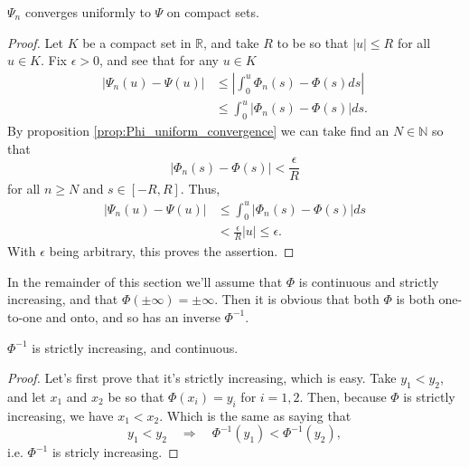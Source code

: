 \documentclass[11pt, a4paper]{article}
\begin{document}
\begin{appendix}
\begin{proposition}
\label{prop:Psi_uniform_convergence}
$\Psi_n$ converges uniformly to $\Psi$ on compact sets.
\end{proposition}
\begin{proof}
Let $K$ be a compact set in $\mathbb{R}$, and take $R$ to be so that $|u| \leq R$ for all $u \in K$. Fix $\epsilon > 0$, and see that for any $u\in K$
\begin{align*}
|\Psi_n(u) - \Psi(u)| &\leq \left|\int_0^u \Phi_n(s) - \Phi(s)ds \right| \\
&\leq \int_0^u |\Phi_n(s) - \Phi(s)|ds.
\end{align*}
By proposition \ref{prop:Phi_uniform_convergence} we can take find an $N \in \mathbb{N}$ so that
\begin{equation*}
|\Phi_n(s) - \Phi(s)| < \frac{\epsilon}{R}
\end{equation*}
for all $n \geq N$ and $s \in [-R, R]$. Thus,
\begin{align*}
|\Psi_n(u) - \Psi(u)| &\leq \int_0^u |\Phi_n(s) - \Phi(s)|ds \\
&< \frac{\epsilon}{R}|u| \leq \epsilon.
\end{align*}
With $\epsilon$ being arbitrary, this proves the assertion.
\end{proof}

In the remainder of this section we'll assume that $\Phi$ is continuous and strictly increasing, and that $\Phi( \pm \infty) = \pm \infty$. Then it is obvious that both $\Phi$ is both one-to-one and onto, and so has an inverse $\Phi^{-1}$.

\begin{proposition}
$\Phi^{-1}$ is strictly increasing, and continuous.
\end{proposition}
\begin{proof}
Let's first prove that it's strictly increasing, which is easy. Take $y_1 < y_2$, and let $x_1$ and $x_2$ be so that $\Phi(x_i) = y_i$ for $i=1,2$. Then, because $\Phi$ is strictly increasing, we have $x_1 < x_2$. Which is the same as saying that
\begin{equation*}
y_1 < y_2 \quad \Rightarrow \quad \Phi^{-1}(y_1) < \Phi^{-1}(y_2),
\end{equation*}
i.e. $\Phi^{-1}$ is stricly increasing.


\end{proof}
\end{appendix}
\end{document}
